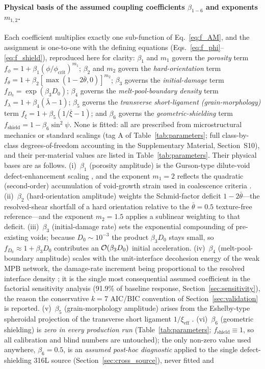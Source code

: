 \documentclass[12pt,a4paper,twocolumn]{article}
\begin{document}
\paragraph{Physical basis of the assumed coupling coefficients $\beta_{1-6}$ and exponents $m_{1,2}$.}
Each coefficient multiplies exactly one sub-function of Eq.~\eqref{eq:f_AM}, and the assignment is one-to-one with the defining equations (Eqs.~\eqref{eq:f_phi}--\eqref{eq:f_shield}), reproduced here for clarity: $\beta_1$ and $m_1$ govern the \emph{porosity} term $f_\phi = 1+\beta_1(\phi/\phi_{\mathrm{crit}})^{m_1}$; $\beta_2$ and $m_2$ govern the \emph{hard-orientation} term $f_\theta = 1+\beta_2[\max(1-2\bar\theta,0)]^{m_2}$; $\beta_3$ governs the \emph{initial-damage} term $f_{D_0}=\exp(\beta_3 D_0)$; $\beta_4$ governs the \emph{melt-pool-boundary density} term $f_\lambda=1+\beta_4(\bar\lambda-1)$; $\beta_5$ governs the \emph{transverse short-ligament (grain-morphology)} term $f_\xi=1+\beta_5(1/\bar\xi-1)$; and $\beta_6$ governs the \emph{geometric-shielding} term $f_{\mathrm{shield}}=1-\beta_6\sin^2\psi$. None is fitted: all are prescribed from microstructural mechanics or standard scalings (tag A of Table~\ref{tab:parameters}; full class-by-class degrees-of-freedom accounting in the Supplementary Material, Section~S10), and their per-material values are listed in Table~\ref{tab:parameters}. Their physical bases are as follows. (i)~$\beta_1$ (porosity amplitude) is the Gurson-type dilute-void defect-enhancement scaling \cite{gurson1977continuum,tvergaard1984analysis}, and the exponent $m_1=2$ reflects the quadratic (second-order) accumulation of void-growth strain used in coalescence criteria \cite{needleman1987}. (ii)~$\beta_2$ (hard-orientation amplitude) weights the Schmid-factor deficit $1-2\bar\theta$---the resolved-shear shortfall of a hard orientation relative to the $\bar\theta=0.5$ texture-free reference---and the exponent $m_2=1.5$ applies a sublinear weighting to that deficit. (iii)~$\beta_3$ (initial-damage rate) sets the exponential compounding of pre-existing voids; because $D_0\sim10^{-3}$ the product $\beta_3 D_0$ stays small, so $f_{D_0}\approx1+\beta_3 D_0$ contributes an ${\cal O}(\beta_3 D_0)$ initial acceleration. (iv)~$\beta_4$ (melt-pool-boundary amplitude) scales with the unit-interface decohesion energy of the weak MPB network, the damage-rate increment being proportional to the resolved interface density \cite{needleman1987,zhang2021modeling}; it is the single most consequential assumed coefficient in the factorial sensitivity analysis (91.9\% of baseline response, Section~\ref{sec:sensitivity}), the reason the conservative $k=7$ AIC/BIC convention of Section~\ref{sec:validation} is reported. (v)~$\beta_5$ (grain-morphology amplitude) arises from the Eshelby-type spheroidal projection of the transverse short ligament $1/\xi_{\mathrm{eff}}$ \cite{eshelby1957}. (vi)~$\beta_6$ (geometric shielding) is \emph{zero in every production run} (Table~\ref{tab:parameters}; $f_{\mathrm{shield}}\equiv1$, so all calibration and blind numbers are untouched); the only non-zero value used anywhere, $\beta_6=0.5$, is an \emph{assumed post-hoc diagnostic} applied to the single defect-shielding 316L source (Section~\ref{sec:cross_source}), never fitted and 
\end{document}
